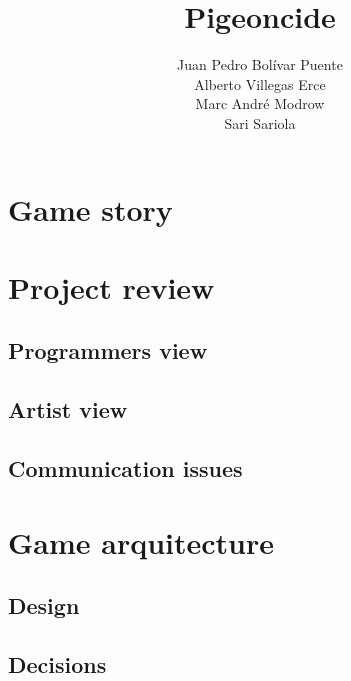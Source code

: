 \documentclass[12pt,a4paper]{article}
\title{\huge Pigeoncide}
\author{
  Juan Pedro Bolívar Puente\\ 
  Alberto Villegas Erce\\
  Marc Andr\'e Modrow\\
  Sari Sariola
}
\begin{document}
\maketitle

\section {Game story}

\section {Project review}
\subsection {Programmers view}
\subsection {Artist view}
\subsection {Communication issues}

\section {Game arquitecture}
\subsection {Design}
\subsection {Decisions}
\end{document}
